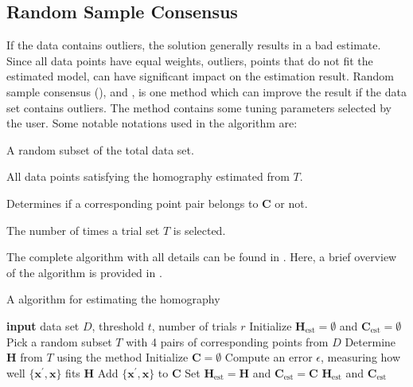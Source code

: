 \subsection{Random Sample Consensus}
\label{sec:ransac}
If the data contains outliers, the \abbrDLT solution generally results in a bad estimate.
Since all data points have equal weights, outliers, \ie points that do not fit the estimated model, can have significant impact on the estimation result.
Random sample consensus (\abbrRANSAC), \eg \cite{Hartley:2004} and \cite{Nordberg:2015}, is one method which can improve the result if the data set contains outliers.
The method contains some tuning parameters selected by the user.
Some notable notations used in the algorithm are:

\begin{description}[align=left,labelwidth=3cm,noitemsep]
	\item [Trial set $T$] A random subset of the total data set.
	\item [Consensus set $\bm{C}$] All data points satisfying the homography estimated from $T$.
	\item [Threshold $t$] Determines if a corresponding point pair belongs to $\bm{C}$ or not.
	\item [Number of trials $r$] The number of times a trial set $T$ is selected.
\end{description}

The complete algorithm with all details can be found in \cite{Nordberg:2015}.
Here, a brief overview of the algorithm is provided in .

\begin{algorithm}[!ht]
	\caption{\label{algo:ransach} A \abbrRANSAC algorithm for estimating the homography}
	\begin{algorithmic}
		\State \textbf{input} data set $D$, threshold $t$, number of trials $r$
		\State Initialize $\bm{H}_\text{est} = \emptyset$ and $\bm{C}_\text{est} = \emptyset$
			\State Pick a random subset $T$ with 4 pairs of corresponding points from $D$
			\State Determine $\bm{H}$ from $T$ using the \abbrDLT method
			\State Initialize $\bm{C} = \emptyset$
				\State Compute an error $\epsilon$, measuring how well $\{\bm{x}^\prime, \bm{x}\}$ fits $\bm{H}$
					\State Add $\{\bm{x}^\prime, \bm{x}\}$ to $\bm{C}$
				\EndIf
			\EndFor
				\State Set $\bm{H}_\text{est} = \bm{H}$ and $\bm{C}_\text{est} = \bm{C}$
			\EndIf
		\EndWhile
		\State \Return $\bm{H}_\text{est}$ and $\bm{C}_\text{est}$
	\end{algorithmic}
\end{algorithm}

